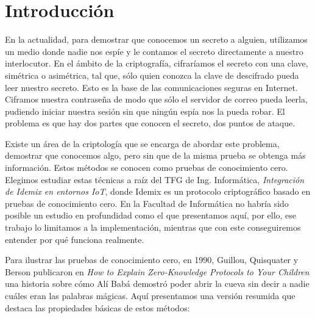 \chapter{Introducción}\label{ch:introduction}

En la actualidad, para demostrar que conocemos un secreto a alguien, utilizamos un medio donde nadie nos espíe y le contamos el secreto directamente a nuestro interlocutor. En el ámbito de la criptografía, cifraríamos el secreto con una clave, simétrica o asimétrica, tal que, sólo quien conozca la clave de descifrado pueda leer nuestro secreto. Esto es la base de las comunicaciones seguras en Internet. Ciframos nuestra contraseña de modo que sólo el servidor de correo pueda leerla, pudiendo iniciar nuestra sesión sin que ningún espía nos la pueda robar. El problema es que hay dos partes que conocen el secreto, dos puntos de ataque.

Existe un área de la criptología que se encarga de abordar este problema, demostrar que conocemos algo, pero sin que de la misma prueba se obtenga más información. Estos métodos se conocen como pruebas de conocimiento cero. Elegimos estudiar estas técnicas a raíz del TFG de Ing. Informática, \textit{Integración de Idemix en entornos IoT}, donde Idemix es un protocolo criptográfico basado en pruebas de conocimiento cero. En la Facultad de Informática no habría sido posible un estudio en profundidad como el que presentamos aquí, por ello, ese trabajo lo limitamos a la implementación, mientras que con este conseguiremos entender por qué funciona realmente.

Para ilustrar las pruebas de conocimiento cero, en 1990, Guillou, Quisquater y Berson publicaron en \textit{How to Explain Zero-Knowledge Protocols to Your Children} \citep{ZKPcave:story} una historia sobre cómo Alí Babá demostró poder abrir la cueva sin decir a nadie cuáles eran las palabras mágicas. Aquí presentamos una versión resumida que destaca las propiedades básicas de estos métodos:

\hfil

